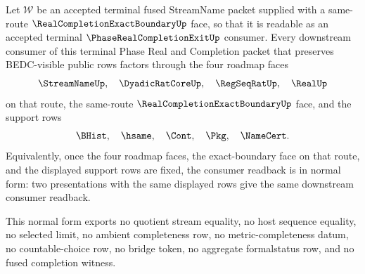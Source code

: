 \begin{theorem}
\label{thm:streamname-terminal-fusion-universal-consumer-normal-form}
Let $\mathcal W$ be an accepted terminal fused StreamName packet supplied with a
same-route $\RealCompletionExactBoundaryUp$ face, so that it is readable as an
accepted terminal $\PhaseRealCompletionExitUp$ consumer. Every downstream
consumer of this terminal Phase Real and Completion packet that preserves
BEDC-visible public rows factors through the four roadmap faces
$$
\StreamNameUp,\quad \DyadicRatCoreUp,\quad \RegSeqRatUp,\quad \RealUp
$$
on that route, the same-route $\RealCompletionExactBoundaryUp$ face, and the
support rows
$$
\BHist,\quad \hsame,\quad \Cont,\quad \Pkg,\quad \NameCert.
$$
Equivalently, once the four roadmap faces, the exact-boundary face on that
route, and the displayed support rows are fixed, the consumer readback is in
normal form: two presentations with the same displayed rows give the same
downstream consumer readback.

This normal form exports no quotient stream equality, no host sequence
equality, no selected limit, no ambient completeness row, no metric-completeness
datum, no countable-choice row, no bridge token, no aggregate formalstatus row,
and no fused completion witness.
\end{theorem}
